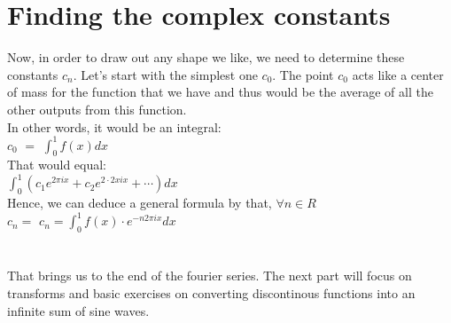 \documentclass{article}
\begin{document}
\section{Finding the complex constants}
Now, in order to draw out any shape we like, we need to determine these constants $c_{n}$. 
Let's start with the simplest one $c_{0}$. The point $c_{0}$ acts like a center of mass for the function that we have and thus would be the average of all the other outputs from this function.\\
In other words, it would be an integral:\\
$c_{0}$ $ = $ $\int_{0}^{1} f(x) dx$\\
That would equal:\\
$\int _ { 0 } ^ { 1 } \left( c _ { 1 } e ^ { 2 \pi i x } + c _ { 2 } e ^ { 2 \cdot 2 x i x } + \cdots \right) d x$\\
Hence, we can deduce a general formula by that, 
$\forall n \in {R}$\\
$c_{n} = $
$c _ { n } = \int _ { 0 } ^ { 1 } f ( x ) \cdot e ^ { - n 2 \pi i x } d x $\\
\\
\\

That brings us to the end of the fourier series. The next part will focus on transforms and basic exercises on converting discontinous functions into an infinite sum of sine waves.
\\
\\
\end{document}
